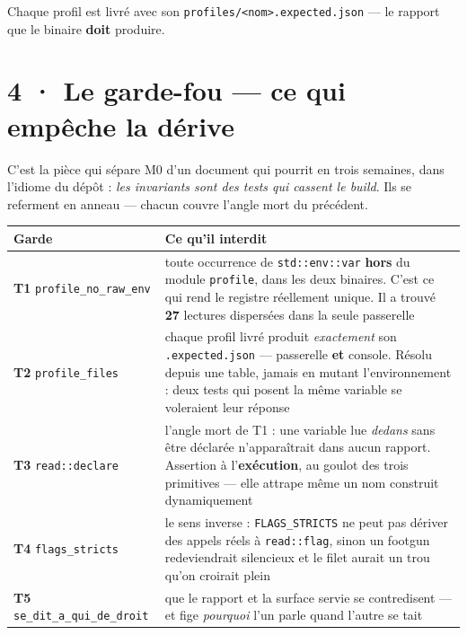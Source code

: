 \documentclass[10pt]{article}
\newcommand{\code}[1]{\texttt{\small #1}}
\begin{document}
Chaque profil est livré avec son \code{profiles/<nom>.expected.json} --- le rapport que le binaire
\textbf{doit} produire.

\section{4 · Le garde-fou --- ce qui empêche la dérive}

C'est la pièce qui sépare M0 d'un document qui pourrit en trois semaines, dans l'idiome du dépôt :
\emph{les invariants sont des tests qui cassent le build}. Ils se referment en anneau --- chacun
couvre l'angle mort du précédent.

\begin{center}\small
\begin{tabular}{@{}>{\raggedright\arraybackslash}p{3.9cm} >{\raggedright\arraybackslash}p{11.6cm}@{}}
\toprule
\textbf{Garde} & \textbf{Ce qu'il interdit} \\
\midrule
\textbf{T1} \code{profile\_no\_raw\_env} & toute occurrence de \code{std::env::var} \textbf{hors} du
module \code{profile}, dans les deux binaires. C'est ce qui rend le registre réellement unique.
Il a trouvé \textbf{27} lectures dispersées dans la seule passerelle \\
\addlinespace[2pt]
\textbf{T2} \code{profile\_files} & chaque profil livré produit \emph{exactement} son
\code{.expected.json} --- passerelle \textbf{et} console. Résolu depuis une table, jamais en mutant
l'environnement : deux tests qui posent la même variable se voleraient leur réponse \\
\addlinespace[2pt]
\textbf{T3} \code{read::declare} & l'angle mort de T1 : une variable lue \emph{dedans} sans être
déclarée n'apparaîtrait dans aucun rapport. Assertion à l'\textbf{exécution}, au goulot des trois
primitives --- elle attrape même un nom construit dynamiquement \\
\addlinespace[2pt]
\textbf{T4} \code{flags\_stricts} & le sens inverse : \code{FLAGS\_STRICTS} ne peut pas dériver des
appels réels à \code{read::flag}, sinon un footgun redeviendrait silencieux et le filet aurait un
trou qu'on croirait plein \\
\addlinespace[2pt]
\textbf{T5} \code{se\_dit\_a\_qui\_de\_droit} & que le rapport et la surface servie se
contredisent --- et fige \emph{pourquoi} l'un parle quand l'autre se tait \\
\bottomrule
\end{tabular}
\end{center}
\end{document}
